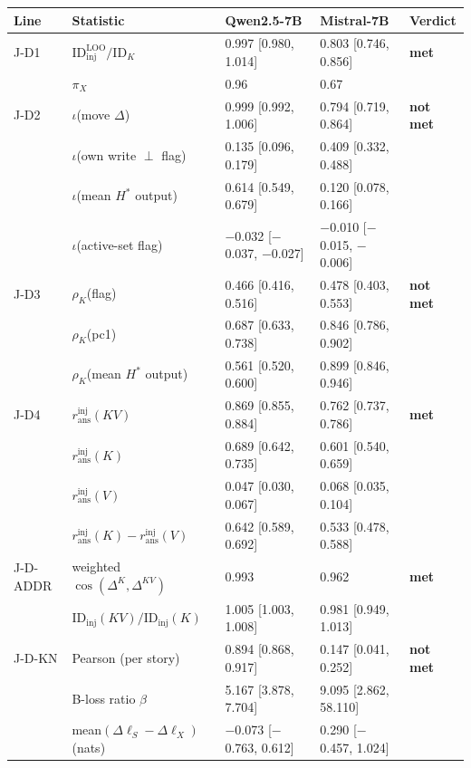 \footnotesize
\setlength{\tabcolsep}{4pt}
\begin{tabular}{@{}lllll@{}}
\toprule
Line & Statistic & Qwen2.5-7B & Mistral-7B & Verdict \\
\midrule
J-D1 & $\mathrm{ID}^{\mathrm{LOO}}_{\mathrm{inj}}/\mathrm{ID}_K$ & 0.997 [0.980, 1.014] & 0.803 [0.746, 0.856] & \textbf{met} \\
 & $\pi_X$ & 0.96 & 0.67 &  \\
J-D2 & $\iota$(move $\Delta$) & 0.999 [0.992, 1.006] & 0.794 [0.719, 0.864] & \textbf{not met} \\
 & $\iota$(own write $\perp$ flag) & 0.135 [0.096, 0.179] & 0.409 [0.332, 0.488] &  \\
 & $\iota$(mean $H^*$ output) & 0.614 [0.549, 0.679] & 0.120 [0.078, 0.166] &  \\
 & $\iota$(active-set flag) & $-$0.032 [$-$0.037, $-$0.027] & $-$0.010 [$-$0.015, $-$0.006] &  \\
J-D3 & $\rho_K$(flag) & 0.466 [0.416, 0.516] & 0.478 [0.403, 0.553] & \textbf{not met} \\
 & $\rho_K$(pc1) & 0.687 [0.633, 0.738] & 0.846 [0.786, 0.902] &  \\
 & $\rho_K$(mean $H^*$ output) & 0.561 [0.520, 0.600] & 0.899 [0.846, 0.946] &  \\
J-D4 & $r^{\mathrm{inj}}_{\mathrm{ans}}(KV)$ & 0.869 [0.855, 0.884] & 0.762 [0.737, 0.786] & \textbf{met} \\
 & $r^{\mathrm{inj}}_{\mathrm{ans}}(K)$ & 0.689 [0.642, 0.735] & 0.601 [0.540, 0.659] &  \\
 & $r^{\mathrm{inj}}_{\mathrm{ans}}(V)$ & 0.047 [0.030, 0.067] & 0.068 [0.035, 0.104] &  \\
 & $r^{\mathrm{inj}}_{\mathrm{ans}}(K) - r^{\mathrm{inj}}_{\mathrm{ans}}(V)$ & 0.642 [0.589, 0.692] & 0.533 [0.478, 0.588] &  \\
J-D-ADDR & weighted $\cos(\Delta^K, \Delta^{KV})$ & 0.993 & 0.962 & \textbf{met} \\
 & $\mathrm{ID}_{\mathrm{inj}}(KV)/\mathrm{ID}_{\mathrm{inj}}(K)$ & 1.005 [1.003, 1.008] & 0.981 [0.949, 1.013] &  \\
J-D-KN & Pearson (per story) & 0.894 [0.868, 0.917] & 0.147 [0.041, 0.252] & \textbf{not met} \\
 & B-loss ratio $\beta$ & 5.167 [3.878, 7.704] & 9.095 [2.862, 58.110] &  \\
 & mean$(\Delta\ell_S - \Delta\ell_X)$ (nats) & $-$0.073 [$-$0.763, 0.612] & 0.290 [$-$0.457, 1.024] &  \\

\end{tabular}

